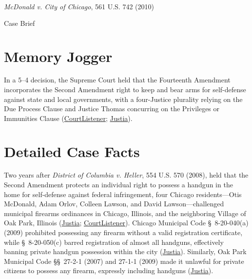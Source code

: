 \documentclass[12pt]{article}
\begin{document}
\begin{center}
{\LARGE \textit{McDonald v. City of Chicago}, 561 U.S. 742 (2010)\par}
\vspace{0.8em}
{\large Case Brief\par}
\end{center}
\vspace{1em}

\section{Memory Jogger}

In a 5--4 decision, the Supreme Court held that the Fourteenth Amendment incorporates the Second Amendment right to keep and bear arms for self-defense against state and local governments, with a four-Justice plurality relying on the Due Process Clause and Justice Thomas concurring on the Privileges or Immunities Clause (\href{https://www.courtlistener.com/opinion/149702/mcdonald-v-city-of-chicago/}{CourtListener}; \href{https://supreme.justia.com/cases/federal/us/561/742/}{Justia}).

\section{Detailed Case Facts}

Two years after \textit{District of Columbia v. Heller}, 554 U.S. 570 (2008), held that the Second Amendment protects an individual right to possess a handgun in the home for self-defense against federal infringement, four Chicago residents---Otis McDonald, Adam Orlov, Colleen Lawson, and David Lawson---challenged municipal firearms ordinances in Chicago, Illinois, and the neighboring Village of Oak Park, Illinois (\href{https://supreme.justia.com/cases/federal/us/561/742/}{Justia}; \href{https://www.courtlistener.com/opinion/149702/mcdonald-v-city-of-chicago/}{CourtListener}). Chicago Municipal Code \S~8-20-040(a) (2009) prohibited possessing any firearm without a valid registration certificate, while \S~8-20-050(c) barred registration of almost all handguns, effectively banning private handgun possession within the city (\href{https://supreme.justia.com/cases/federal/us/561/742/}{Justia}). Similarly, Oak Park Municipal Code \S\S~27-2-1 (2007) and 27-1-1 (2009) made it unlawful for private citizens to possess any firearm, expressly including handguns (\href{https://supreme.justia.com/cases/federal/us/561/742/}{Justia}).
\end{document}
